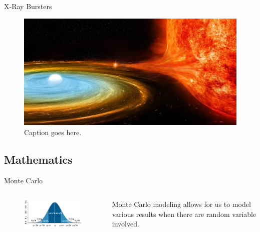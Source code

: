 \documentclass[12pt, aspectratio=169]{beamer}
\begin{document}
\begin{frame}{X-Ray Bursters}
  

\begin{figure}
\includegraphics[width=\textwidth]{Xburster2.jpg}
\caption{\label{fig:your-figure}Caption goes here.}
\end{figure}

\end{frame}


\subsection{Mathematics}

\begin{frame}{Monte Carlo}

\begin{columns}
    \centering
      \begin{figure}
        \includegraphics[width=\textwidth]{probability.png}
      \end{figure}
   Monte Carlo modeling allows for us to model various results when there are random variable involved. 
 
\end{columns}
\end{frame}
\end{document}
